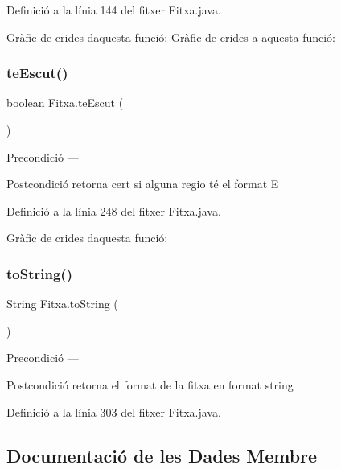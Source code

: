 Definició a la línia 144 del fitxer Fitxa.\+java.

Gràfic de crides d\textquotesingle{}aquesta funció\+:
Gràfic de crides a aquesta funció\+:
\mbox{\label{class_fitxa_a0eacd16882fa0f48bae001b559d3dd13}} 
\subsubsection{\texorpdfstring{te\+Escut()}{teEscut()}}
{\footnotesize\ttfamily boolean Fitxa.\+te\+Escut (\begin{DoxyParamCaption}{ }\end{DoxyParamCaption})}

\begin{DoxyPrecond}{Precondició}
--- 
\end{DoxyPrecond}
\begin{DoxyPostcond}{Postcondició}
retorna cert si alguna regio té el format E 
\end{DoxyPostcond}


Definició a la línia 248 del fitxer Fitxa.\+java.

Gràfic de crides d\textquotesingle{}aquesta funció\+:
\mbox{\label{class_fitxa_aa6b287700281102d846e2522d34074fe}} 
\subsubsection{\texorpdfstring{to\+String()}{toString()}}
{\footnotesize\ttfamily String Fitxa.\+to\+String (\begin{DoxyParamCaption}{ }\end{DoxyParamCaption})}

\begin{DoxyPrecond}{Precondició}
--- 
\end{DoxyPrecond}
\begin{DoxyPostcond}{Postcondició}
retorna el format de la fitxa en format string 
\end{DoxyPostcond}


Definició a la línia 303 del fitxer Fitxa.\+java.



\subsection{Documentació de les Dades Membre}
\mbox{\label{class_fitxa_a660ca2f91a04c1ca58020858d58750a5}} 
